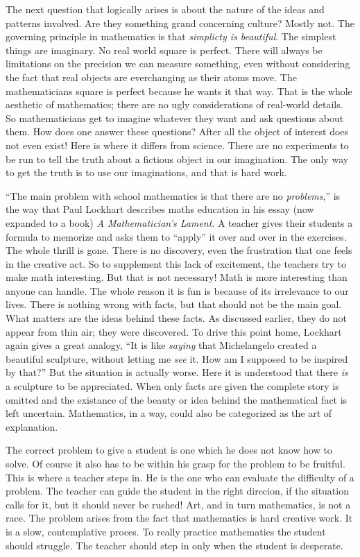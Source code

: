 \documentclass[a4paper,12pt]{article}
\begin{document}
The next question that logically arises is about the nature of the ideas and
patterns involved. Are they something grand concerning culture? Mostly not. The
governing principle in mathematics is that \textit{simplicty is beautiful}. The
simplest things are imaginary. No real world square is perfect. There will
always be limitations on the precision we can measure something, even without
considering the fact that real objects are everchanging as their atoms move. The
mathematicians square is perfect because he wants it that way. That is the whole
aesthetic of mathematics; there are no ugly considerations of real-world
details. So mathematicians get to imagine whatever they want and ask questions
about them. How does one answer these questions? After all the object of interest
does not even exist! Here is where it differs from science. There are no
experiments to be run to tell the truth about a fictious object in our
imagination. The only way to get the truth is to use our imaginations, and that
is hard work.

``The main problem with school mathematics is that there are no
\textit{problems},'' is the way that Paul Lockhart describes maths education in
his essay (now expanded to a book) \textit{A Mathematician's Lament}. A teacher
gives their students a formula to memorize and asks them to ``apply'' it over
and over in the exercises. The whole thrill is gone. There is no discovery, even
the frustration that one feels in the creative act. So to supplement this lack
of excitement, the teachers try to make math interesting. But that is not
necessary! Math is more interesting than anyone can handle. The whole reason it
is fun is because of its irrelevance to our lives. There is nothing wrong with
facts, but that should not be the main goal. What matters are the ideas behind
these facts. As discussed earlier, they do not appear from thin air; they were
discovered. To drive this point home, Lockhart again gives a great analogy, ``It
is like \textit{saying} that Michelangelo created a beautiful sculpture, without
letting me \textit{see} it. How am I supposed to be inspired by that?'' But the
situation is actually worse. Here it is understood that there \textit{is} a
sculpture to be appreciated. When only facts are given the complete story is
omitted and the existance of the beauty or idea behind the mathematical fact is left
uncertain. Mathematics, in a way, could also be categorized as the art of
explanation.

The correct problem to give a student is one which he does not know
how to solve. Of course it also has to be within his grasp for the problem to be
fruitful. This is where a teacher steps in. He is the one who can evaluate the
difficulty of a problem. The teacher can guide the student in the right
direcion, if the situation calls for it, but it should never be rushed! Art, and
in turn mathematics, is not a race. The problem arises from the fact that
mathematics is hard creative work. It is a slow, contemplative proces. To really
practice mathematics the student should struggle. The teacher should step in
only when the student is desperate.
\end{document}
